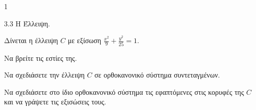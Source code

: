 \begin{ylh}{1}
    \item 3.3 Η Έλλειψη.
\end{ylh}
Δίνεται η έλλειψη $C$ με εξίσωση $\frac{x^2}{9} + \frac{y^2}{25} = 1$.
\begin{alist}
\item Να βρείτε τις εστίες της. 
\item Να σχεδιάσετε την έλλειψη $C$ σε ορθοκανονικό σύστημα συντεταγμένων. 
\item Να σχεδιάσετε στο ίδιο ορθοκανονικό σύστημα τις εφαπτόμενες στις κορυφές της $C$ και να γράψετε τις εξισώσεις τους. 
\end{alist}